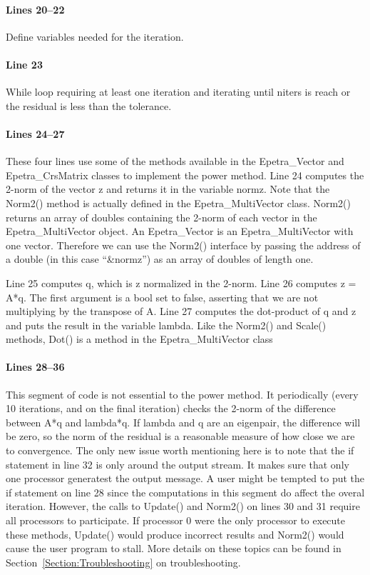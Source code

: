 \documentclass[12pt,relax]{EpetraUserGuide}
\renewcommand{\vector}{Epetra\_Vector}
\newcommand{\multivector}{Epetra\_MultiVector}
\newcommand{\crsmatrix}{Epetra\_CrsMatrix}
\begin{document}
\paragraph{Lines 20--22}
Define variables needed for the iteration.
\paragraph{Line 23} While loop requiring at least one iteration and
iterating until niters is reach or the residual is less than the
tolerance.
\paragraph{Lines 24--27}
These four lines use some of the methods available in the \vector{}
and \crsmatrix{} classes to implement the power method.  Line 24
computes the 2-norm of the vector z and returns it in the variable
normz.  Note that the Norm2() method is actually defined in the
\multivector{} class.  Norm2() returns an array of doubles containing
the 2-norm of each vector in the \multivector{} object.  An \vector{} is
an \multivector{} with one vector.  Therefore we can use the Norm2()
interface by passing the address of a double (in this case
``\&normz'') as an array of doubles of length one.

Line 25 computes q, which is z normalized in the 2-norm.  Line 26
computes z = A*q.  The first argument is a bool set to false, asserting
that we are not multiplying by the transpose of A.  Line 27 computes
the dot-product of q and z and puts the result in the variable
lambda.  Like the Norm2() and Scale() methods, Dot() is a method in
the \multivector{} class
\paragraph{Lines 28--36}
This segment of code is not essential to the power method.  It
periodically (every 10 iterations, and on the final iteration) checks
the 2-norm of the difference between A*q and lambda*q.  If lambda and
q are an eigenpair, the difference will be zero, so the norm of the
residual is a reasonable measure of how close we are to convergence.
The only new issue worth mentioning here is to note that the if statement in
line 32 is only around the output stream.  It makes sure that only one
processor generatest the output message.  A user might be tempted to
put the if statement on line 28 since the computations in this segment
do affect the overal iteration.  However, the calls to Update() and
Norm2() on lines 30 and 31 require all processors to participate.  If
processor 0 were the only processor to execute these methods, Update()
would produce incorrect results and Norm2() would cause the user
program to stall.  More details on these topics can be found in
Section~\ref{Section:Troubleshooting} on troubleshooting.
\end{document}
